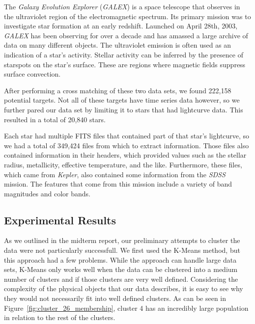 \documentclass[12pt]{article}
\begin{document}
The \textit{Galaxy Evolution Explorer} (\textit{GALEX}) is a space telescope that observes in the ultraviolet region of the electromagnetic spectrum.
Its primary mission was to investigate star formation at an early redshift.
Launched on April 28th, 2003, \textit{GALEX} has been observing for over a decade and has amassed a large archive of data on many different objects.
The ultraviolet emission is often used as an indication of a star's activity.
Stellar activity can be inferred by the presence of starspots on the star's surface.
These are regions where magnetic fields suppress surface convection.

After performing a cross matching of these two data sets, we found 222,158 potential targets.
Not all of these targets have time series data however, so we further pared our data set by limiting it to stars that had lightcurve data.
This resulted in a total of 20,840 stars.

Each star had multiple FITS files that contained part of that star's lightcurve, so we had a total of 349,424 files from which to extract information.
Those files also contained information in their headers, which provided values such as the stellar radius, metallicity, effective temperature, and the like.
Furthermore, these files, which came from \textit{Kepler}, also contained some information from the \textit{SDSS} mission.
The features that come from this mission include a variety of band magnitudes and color bands.


\subsection{Experimental Results} %
\label{sub:Experimental Results}
As we outlined in the midterm report, our preliminary attempts to cluster the data were not particularly successfull.
We first used the K-Means method, but this approach had a few problems.
While the approach can handle large data sets, K-Means only works well when the data can be clustered into a medium number of clusters and if those clusters are very well defined.
Considering the complexity of the physical objects that our data describes, it is easy to see why they would not necessarily fit into well defined clusters.
As can be seen in Figure~\ref{fig:cluster_26_membership}, cluster 4 has an incredibly large population in relation to the rest of the clusters.
\end{document}
